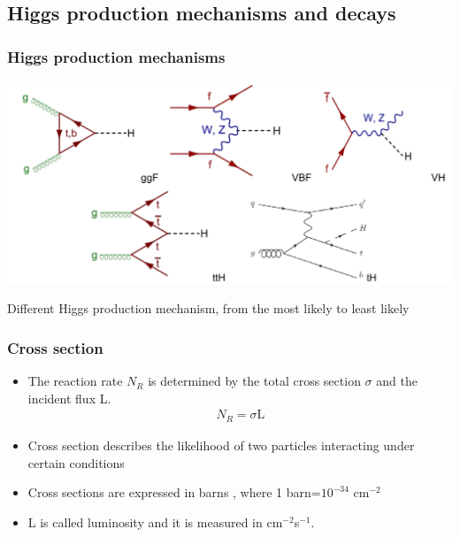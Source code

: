 \documentclass[11pt]{beamer}
\newcommand{\nologo}{\setbeamertemplate{logo}{}}
\begin{document}
{\nologo
\begin{frame}
\subsection{Higgs production mechanisms and decays}
\frametitle{Higgs production mechanisms}

\begin{center}
\includegraphics[scale=0.4]{figures/pg.png}
\end{center}
\small{Different Higgs production mechanism, from the most likely to least likely}
\end{frame}
}

\begin{frame}
\frametitle{Cross section}
\begin{itemize}
	\item The reaction rate $N_R$ is determined by the total cross section $\sigma$ and the incident flux L.
	\begin{align}
	N_R=\sigma \text{L}
	\end{align}
\item Cross section describes the likelihood of two particles interacting under certain conditions\cite{1}\cite{6}
\item Cross sections are expressed in barns , where 1 barn=$10^{-34}$ cm$^{-2}$ 

\item L is called luminosity and it is measured in cm$^{-2}$s$^{-1}$.\cite{6}
\end{itemize}
\end{frame}
\end{document}
